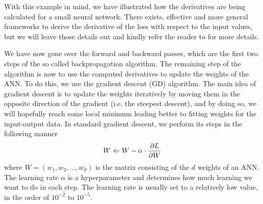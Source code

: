 With this example in mind, we have illustrated how the derivatives are being calculated for a small neural network. There exists, effective and more general frameworks to derive the derivative of the loss with respect to the input values, but we will leave those details out and kindly refer the reader to \cite[Chapter 1.3]{Aggarwal18} for more details.

We have now gone over the forward and backward passes, which are the first two steps of the so called backpropagation algorithm. The remaining step of the algorithm is now to use the computed derivatives to update the weights of the ANN. To do this, we use the gradient descent (GD) algorithm. The main idea of gradient descent is to update the weights iteratively by moving them in the opposite direction of the gradient (i.e. the steepest descent), and by doing so, we will hopefully reach some local minimum leading better to fitting weights for the input-output data. In standard gradient descent, we perform its steps in the following manner
\begin{align}
    W \Leftarrow W - \alpha \cdot \frac{\partial L}{\partial W}
\end{align}
where $W = \left( w_1, w_2, \ldots, w_d \right)$ is the matrix consisting of the $d$ weights of an ANN. The learning rate $\alpha$ is a hyperparameter and determines how much learning we want to do in each step. The learning rate is usually set to a relatively low value, in the order of $10^{-2}$ to $10^{-5}$.

